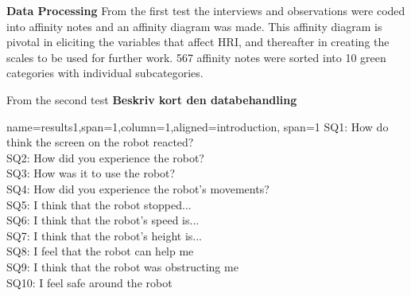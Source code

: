 \documentclass[paperwidth=160cm,paperheight=100cm,landscape,fontscale=0.3010]{baposter}
\begin{document}
\begin{poster}
{\textbf{Data Processing}
From the first test the interviews and observations were coded into affinity notes and an affinity diagram was made. This affinity diagram is pivotal in eliciting the variables that affect HRI, and thereafter in creating the scales to be used for further work. 
567 affinity notes were sorted into 10 green categories with individual subcategories. 

From the second test \textbf{Beskriv kort den databehandling}
}


{name=results1,span=1,column=1,aligned=introduction, span=1}
{\parskip 5pt 
%	
SQ1: How do think the screen on the robot reacted? \\%
SQ2: How did you experience the robot? \\ %
SQ3: How was it to use the robot?\\%
SQ4: How did you experience the robot's movements? \\%
SQ5: I think that the robot stopped... \\%
SQ6: I think that the robot's speed is... \\%
SQ7: I think that the robot's height is... \\%
SQ8: I feel that the robot can help me\\%
SQ9: I think that the robot was obstructing me\\%
SQ10: I feel safe around the robot\\%
}
\end{poster}
\end{document}
